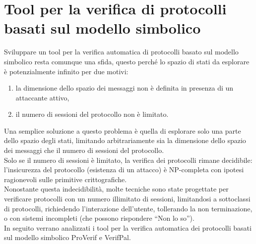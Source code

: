 \section{Tool per la verifica di protocolli basati sul modello simbolico}
\label{sez:tool}

Sviluppare un tool per la verifica automatica di protocolli basato sul modello simbolico resta comunque una sfida, questo perch\'e lo spazio di stati da esplorare è potenzialmente infinito per due motivi:
\begin{enumerate}
    \item la dimensione dello spazio dei messaggi non è definita in presenza di un attaccante attivo,
    \item il numero di sessioni del protocollo non è limitato.
\end{enumerate}
Una semplice soluzione a questo problema è quella di esplorare solo una parte dello spazio degli stati, limitando arbitrariamente sia la dimensione dello spazio dei messaggi che il numero di sessioni del protocollo.\\
Solo se il numero di sessioni è limitato, la verifica dei protocolli rimane decidibile: l'insicurezza del protocollo (esistenza di un attacco) è NP-completa con ipotesi ragionevoli sulle primitive crittografiche.\\
Nonostante questa indecidibilità, molte tecniche sono state progettate per verificare protocolli con un numero illimitato di sessioni, limitandosi a sottoclassi di protocolli, richiedendo l'interazione dell'utente, tollerando la non terminazione, o con sistemi incompleti (che possono rispondere ``Non lo so'').\\
In seguito verrano analizzati i tool per la verifica automatica dei protocolli basati sul modello simbolico ProVerif e VerifPal.\\





